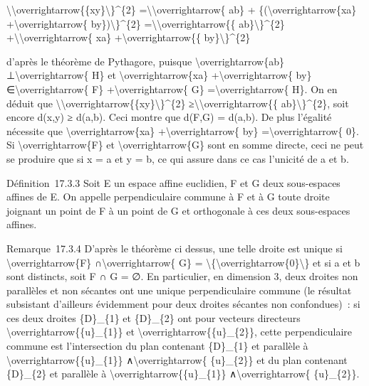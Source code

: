 \documentclass[]{article}
\begin{document}
\textbackslash{}\textbar{}\textbackslash{}overrightarrow\{\{xy\}\textbackslash{}\textbar{}\}\^{}\{2\}
=\textbackslash{}\textbar{}\textbackslash{}overrightarrow\{ ab\} +
\{(\textbackslash{}overrightarrow\{xa\}
+\textbackslash{}overrightarrow\{
by\})\textbackslash{}\textbar{}\}\^{}\{2\}
=\textbackslash{}\textbar{}\textbackslash{}overrightarrow\{\{
ab\}\textbackslash{}\textbar{}\}\^{}\{2\}
+\textbackslash{}\textbar{}\textbackslash{}overrightarrow\{ xa\}
+\textbackslash{}overrightarrow\{\{
by\}\textbackslash{}\textbar{}\}\^{}\{2\}

d'après le théorème de Pythagore, puisque
\textbackslash{}overrightarrow\{ab\} ⊥\textbackslash{}overrightarrow\{
H\} et \textbackslash{}overrightarrow\{xa\}
+\textbackslash{}overrightarrow\{ by\} ∈\textbackslash{}overrightarrow\{
F\} +\textbackslash{}overrightarrow\{ G\}
=\textbackslash{}overrightarrow\{ H\}. On en déduit que
\textbackslash{}\textbar{}\textbackslash{}overrightarrow\{\{xy\}\textbackslash{}\textbar{}\}\^{}\{2\}
≥\textbackslash{}\textbar{}\textbackslash{}overrightarrow\{\{
ab\}\textbackslash{}\textbar{}\}\^{}\{2\}, soit encore d(x,y) ≥ d(a,b).
Ceci montre que d(F,G) = d(a,b). De plus l'égalité nécessite que
\textbackslash{}overrightarrow\{xa\} +\textbackslash{}overrightarrow\{
by\} =\textbackslash{}overrightarrow\{ 0\}. Si
\textbackslash{}overrightarrow\{F\} et
\textbackslash{}overrightarrow\{G\} sont en somme directe, ceci ne peut
se produire que si x = a et y = b, ce qui assure dans ce cas l'unicité
de a et b.

Définition~17.3.3 Soit E un espace affine euclidien, F et G deux
sous-espaces affines de E. On appelle perpendiculaire commune à F et à G
toute droite joignant un point de F à un point de G et orthogonale à ces
deux sous-espaces affines.

Remarque~17.3.4 D'après le théorème ci dessus, une telle droite est
unique si \textbackslash{}overrightarrow\{F\}
∩\textbackslash{}overrightarrow\{ G\} =
\textbackslash{}\{\textbackslash{}overrightarrow\{0\}\textbackslash{}\}
et si a et b sont distincts, soit F ∩ G = ∅. En particulier, en
dimension 3, deux droites non parallèles et non sécantes ont une unique
perpendiculaire commune (le résultat subsistant d'ailleurs évidemment
pour deux droites sécantes non confondues)~: si ces deux droites
\{D\}\_\{1\} et \{D\}\_\{2\} ont pour vecteurs directeurs
\textbackslash{}overrightarrow\{\{u\}\_\{1\}\} et
\textbackslash{}overrightarrow\{\{u\}\_\{2\}\}, cette perpendiculaire
commune est l'intersection du plan contenant \{D\}\_\{1\} et parallèle à
\textbackslash{}overrightarrow\{\{u\}\_\{1\}\}
∧\textbackslash{}overrightarrow\{ \{u\}\_\{2\}\} et du plan contenant
\{D\}\_\{2\} et parallèle à
\textbackslash{}overrightarrow\{\{u\}\_\{1\}\}
∧\textbackslash{}overrightarrow\{ \{u\}\_\{2\}\}.
\end{document}
